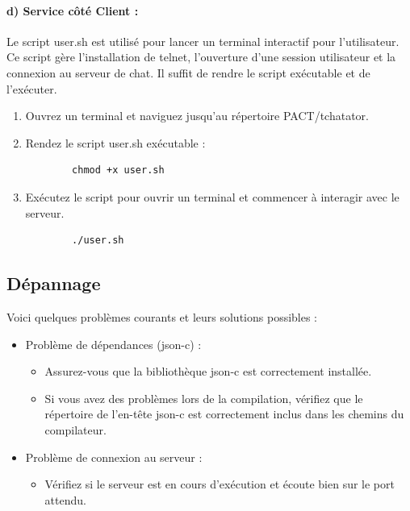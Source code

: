 \documentclass{report}
\begin{document}
\paragraph{d) Service côté Client :}

Le script user.sh est utilisé pour lancer un terminal interactif pour l'utilisateur. Ce script gère l'installation de telnet, l'ouverture d'une session utilisateur et la connexion au serveur de chat. Il suffit de rendre le script exécutable et de l'exécuter.

\begin{enumerate}
	\item Ouvrez un terminal et naviguez jusqu'au répertoire PACT/tchatator.
	
	\item Rendez le script user.sh exécutable :
	\begin{verbatim}
		chmod +x user.sh
	\end{verbatim}
	
	\item Exécutez le script pour ouvrir un terminal et commencer à interagir avec le serveur.
	
	\begin{verbatim}
		./user.sh
	\end{verbatim}
\end{enumerate}

\subsection{Dépannage}

Voici quelques problèmes courants et leurs solutions possibles :

\begin{itemize}
	\item Problème de dépendances (json-c) :
	\begin{itemize}
		\item Assurez-vous que la bibliothèque json-c est correctement installée.
		\item Si vous avez des problèmes lors de la compilation, vérifiez que le répertoire de l'en-tête json-c est correctement inclus dans les chemins du compilateur.
	\end{itemize}
	\item Problème de connexion au serveur :
	\begin{itemize}
		\item Vérifiez si le serveur est en cours d'exécution et écoute bien sur le port attendu.
	\end{itemize}
\end{itemize}
\end{document}
